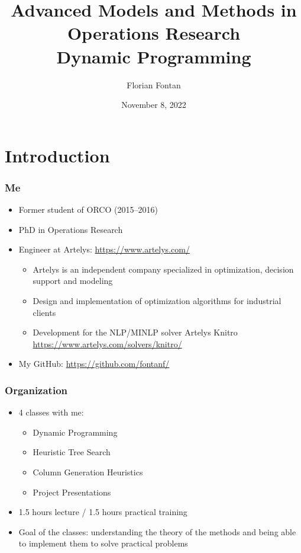 \documentclass{beamer}
\author{Florian Fontan}
\title{Advanced Models and Methods in Operations Research \\ Dynamic Programming}
\date{November 8, 2022}
\begin{document}
\newcommand{\customcite}[1]{\citetitle{#1}, \citeauthor{#1}, \citeyear{#1}}


\maketitle

\section{Introduction}

\begin{frame}
  \frametitle{Me}

  \begin{itemize}
    \item Former student of ORCO (2015--2016)
    \item PhD in Operations Research
    \item Engineer at Artelys: \url{https://www.artelys.com/}
      \begin{itemize}
        \item Artelys is an independent company specialized in optimization, decision support and modeling
        \item Design and implementation of optimization algorithms for industrial clients
        \item Development for the NLP/MINLP solver Artelys Knitro \url{https://www.artelys.com/solvers/knitro/}
      \end{itemize}
    \item My GitHub: \url{https://github.com/fontanf/}
  \end{itemize}
\end{frame}

\begin{frame}
  \frametitle{Organization}
  \begin{itemize}
    \item 4 classes with me:
      \begin{itemize}
        \item Dynamic Programming
        \item Heuristic Tree Search
        \item Column Generation Heuristics
        \item Project Presentations
      \end{itemize}
    \item 1.5 hours lecture / 1.5 hours practical training
      \item Goal of the classes: understanding the theory of the methods and being able to implement them to solve practical problems
  \end{itemize}
\end{frame}
\end{document}
